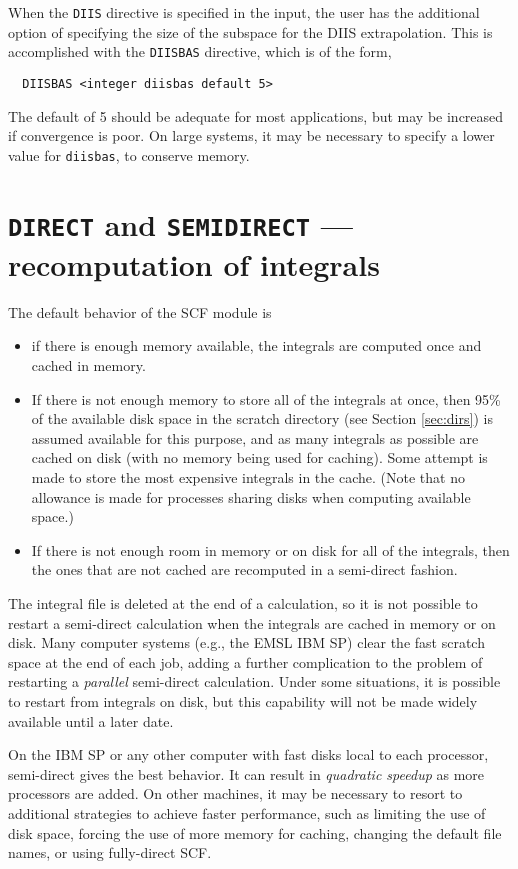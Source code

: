 When the \verb+DIIS+ directive is specified in the input, the user has
the additional option of specifying the size of the subspace for the DIIS
extrapolation.  This is accomplished with the \verb+DIISBAS+ directive,
which is of the form,
\begin{verbatim}
  DIISBAS <integer diisbas default 5>
\end{verbatim}
The default of 5 should be adequate for most applications, but may be
increased if convergence is poor.  On large systems, it may be necessary
to specify a lower value for \verb+diisbas+, to conserve memory.

\section{{\tt DIRECT} and {\tt SEMIDIRECT} --- recomputation of integrals}
\label{sec:semidirect}

The default behavior of the SCF module is
\begin{itemize}
\item if there is enough memory available, the integrals are computed
   once and cached in memory.
 \item If there is not enough memory to store all of the integrals at
   once, then 95\% of the available disk space in the scratch
   directory (see Section \ref{sec:dirs}) is assumed available for
   this purpose, and as many integrals as possible are cached on disk
   (with no memory being used for caching).  Some attempt is made to
   store the most expensive integrals in the cache.  (Note that no
   allowance is made for processes sharing disks when computing
   available space.)
 \item If there is not enough room in memory or on disk for all of the
   integrals, then the ones that are not cached are recomputed in a
   semi-direct fashion.
\end{itemize}

The integral file is deleted at the end of a calculation, so it is not
possible to restart a semi-direct calculation when the integrals are
cached in memory or on disk.  Many computer systems (e.g., the EMSL
IBM SP) clear the fast scratch space at the end of each job, adding a
further complication to the problem of restarting a {\em parallel}
semi-direct calculation.  Under some situations, it is possible to
restart from integrals on disk, but this capability will not be made
widely available until a later date.

On the IBM SP or any other computer with fast disks local to each
processor, semi-direct gives the best behavior.  It can result in
{\em quadratic speedup} as more processors are added.  On other
machines, it may be necessary to resort to additional strategies to
achieve faster performance, such as limiting the use of disk space,
forcing the use of more memory for caching, changing the default file
names, or using fully-direct SCF.

